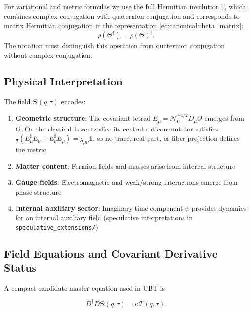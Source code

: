 For variational and metric formulas we use the full Hermitian involution
$\ddagger$, which combines complex conjugation with quaternion conjugation and
corresponds to matrix Hermitian conjugation in the representation
\eqref{eq:canonical:theta_matrix}:
\begin{equation}
  \rho(\Theta^\ddagger)=\rho(\Theta)^\dagger.
\end{equation}
The notation must distinguish this operation from quaternion conjugation without
complex conjugation.

\subsection{Physical Interpretation}

The field $\Theta(q,\tau)$ encodes:

\begin{enumerate}
    \item \textbf{Geometric structure}: The covariant tetrad $E_\mu=\mathcal N_0^{-1/2}D_\mu\Theta$ emerges from $\Theta$.  On the classical Lorentz slice its central anticommutator satisfies $\tfrac12(E_\mu^\sharp E_\nu+E_\nu^\sharp E_\mu)=g_{\mu\nu}\mathbf1$, so no trace, real-part, or fiber projection defines the metric
    
    \item \textbf{Matter content}: Fermion fields and masses arise from internal structure
    
    \item \textbf{Gauge fields}: Electromagnetic and weak/strong interactions emerge from phase structure
    
    \item \textbf{Internal auxiliary sector}: Imaginary time component $\psi$ provides dynamics for an internal auxiliary field (speculative interpretations in \texttt{speculative\_extensions/})
\end{enumerate}

\subsection{Field Equations and Covariant Derivative Status}

A compact candidate master equation used in UBT is

\begin{equation}
\label{eq:canonical:theta_equation}
D^\dagger D\Theta(q,\tau)=\kappa\mathcal T(q,\tau).
\end{equation}

